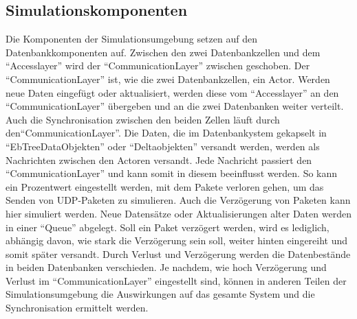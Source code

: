 \documentclass[a4paper,11pt,oneside,%
headsepline,												%
footsepline,												%
bibtotocnumbered									%
]{scrreprt}
\begin{document}
\subsection{Simulationskomponenten}     
Die Komponenten der Simulationsumgebung setzen auf den Datenbankkomponenten auf. Zwischen den zwei Datenbankzellen und dem \enquote{Accesslayer} wird der \enquote{CommunicationLayer} zwischen geschoben. Der \enquote{CommunicationLayer} ist, wie die zwei Datenbankzellen, ein Actor. Werden neue Daten eingefügt oder aktualisiert, werden diese vom \enquote{Accesslayer} an den \enquote{CommunicationLayer} übergeben und an die zwei Datenbanken weiter verteilt. Auch die Synchronisation zwischen den beiden Zellen läuft durch den\enquote{CommunicationLayer}. Die Daten, die im Datenbankystem gekapselt in \enquote{EbTreeDataObjekten} oder \enquote{Deltaobjekten} versandt werden, werden als Nachrichten zwischen den Actoren versandt. Jede Nachricht passiert den \enquote{CommunicationLayer} und kann somit in diesem beeinflusst werden. So kann ein Prozentwert eingestellt werden, mit dem Pakete verloren gehen, um das Senden von UDP-Paketen zu simulieren. Auch die Verzögerung von Paketen kann hier simuliert werden. Neue Datensätze oder Aktualisierungen alter Daten werden in einer \enquote{Queue} abgelegt. Soll ein Paket verzögert werden, wird es lediglich, abhängig davon, wie stark die Verzögerung sein soll, weiter hinten eingereiht und somit später versandt. Durch Verlust und Verzögerung werden die Datenbestände in beiden Datenbanken verschieden. Je nachdem, wie hoch Verzögerung und Verlust im \enquote{CommunicationLayer} eingestellt sind, können in anderen Teilen der Simulationsumgebung die Auswirkungen auf das gesamte System und die Synchronisation ermittelt werden.\\\\
\end{document}
